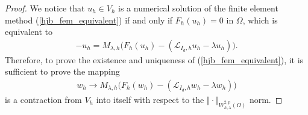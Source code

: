 \documentclass[12pt]{amsart}
\theoremstyle{definition}
\theoremstyle{remark}
\begin{document}
\begin{proof}
We notice that $u_{h}\in V_{h}$ is a numerical solution of the finite element 
method (\ref{hjb_fem_equivalent}) if and only if $F_{h}(u_{h}) = 0$ in $\Omega$, 
which is equivalent to 
\begin{align*}
-u_{h} = M_{\lambda,h}\big(F_{h}(u_{h}) - (\mathcal{L}_{I_{d},h}u_{h}
-\lambda u_{h}) \big).
\end{align*}
Therefore, to prove the existence and uniqueness of (\ref{hjb_fem_equivalent}), 
it is sufficient to prove the mapping 
\begin{align}
\label{hjb_fem_contraction} 
w_{h} \rightarrow M_{\lambda,h}\big( F_{h}(w_{h}) - (\mathcal{L}_{I_{d},h}w_{h}
-\lambda w_{h}) \big)
\end{align}
is a contraction from $V_{h}$ into itself with respect to the 
$\Vert \cdot \Vert_{W_{h,\lambda}^{2,p}(\Omega)}$ norm.


\end{proof}
\end{document}
